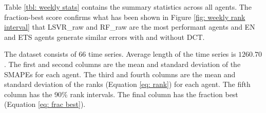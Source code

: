Table \ref{tbl: weekly stats} contains the summary statistics across all agents. The fraction-best score confirms what has been shown in Figure \ref{fig: weekly rank interval} that LSVR\_raw and RF\_raw are the most performant agents and EN and ETS agents generate similar errors with and without DCT.
\begin{table}[H]
    \caption{Summary statistics of all agents on weekly financial time series}
    {\raggedright \footnotesize The dataset consists of $66$ time series. Average length of the time series is $1260.70$. The first and second columns are the mean and standard deviation of the SMAPEs for each agent. The third and fourth columns are the mean and standard deviation of the ranks (Equation \ref{eq: rank}) for each agent. The fifth column has the 90\% rank intervals. The final column has the fraction best (Equation \ref{eq: frac best}). \par}
    \label{tbl: weekly stats}
\end{table}

